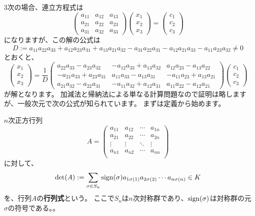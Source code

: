 3次の場合、連立方程式は
\[
  \begin{pmatrix}
    a_{11} & a_{12} & a_{13} \\
    a_{21} & a_{22} & a_{23} \\
    a_{31} & a_{32} & a_{33}
  \end{pmatrix}
  \begin{pmatrix}
    x_1 \\ x_2 \\ x_3
  \end{pmatrix}
  =
  \begin{pmatrix}
    c_1 \\ c_2 \\ c_3
  \end{pmatrix}
\]
になりますが、この解の公式は
\[
  D:=a_{11}a_{22}a_{33}+a_{12}a_{23}a_{31}+a_{13}a_{21}a_{32}-a_{31}a_{22}a_{31}-a_{12}a_{21}a_{33}-a_{11}a_{23}a_{32}\neq0
\]
とおくと、
\[
  \begin{pmatrix}
    x_1 \\ x_2 \\ x_3
  \end{pmatrix}
  =
  \frac1D
  \begin{pmatrix}
    a_{22}a_{33}-a_{23}a_{32} & -a_{12}a_{33}+a_{13}a_{32} & a_{12}a_{23}-a_{13}a_{22} \\
    -a_{21}a_{33}+a_{23}a_{31} & a_{11}a_{33}-a_{13}a_{31} & -a_{11}a_{23}+a_{13}a_{21} \\
    a_{21}a_{32}-a_{22}a_{31} & -a_{11}a_{32}+a_{12}a_{31} & a_{11}a_{22}-a_{12}a_{21}
  \end{pmatrix}
  \begin{pmatrix}
    c_1 \\ c_2 \\ c_3
  \end{pmatrix}
\]
が解となります。
加減法と帰納法による単なる計算問題なので証明は略しますが、一般次元で次の公式が知られています。
まずは定義から始めます。
\begin{definition}
  $n$次正方行列
  \[
    A=\begin{pmatrix}
      a_{11} & a_{12} & \cdots & a_{1n}\\
      a_{21} & a_{22} & \cdots & a_{2n}\\
      \vdots & \vdots & \ddots & \vdots\\
      a_{n1} & a_{n2} & \cdots & a_{nn}\\
    \end{pmatrix}
  \]
  に対して、
  \[
    \det(A):=\sum_{\sigma\in S_n}{\rm sign}(\sigma)a_{1\sigma(1)}a_{2\sigma(2)}\cdots a_{n\sigma(n)}\in K
  \]
  を、行列$A$の\textbf{行列式}という。
  ここで$S_n$は$n$次対称群であり、${\rm sign}(\sigma)$は対称群の元$\sigma$の符号である。。
\end{definition}
